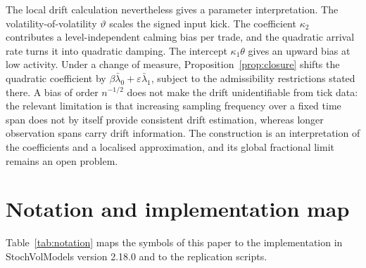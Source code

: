 The local drift calculation nevertheless gives a parameter interpretation. The volatility-of-volatility $\vartheta$ scales the signed input kick. The coefficient $\kappa_2$ contributes a level-independent calming bias per trade, and the quadratic arrival rate turns it into quadratic damping. The intercept $\kappa_1\theta$ gives an upward bias at low activity. Under a change of measure, Proposition~\ref{prop:closure} shifts the quadratic coefficient by $\beta\bar\lambda_0+\varepsilon\bar\lambda_1$, subject to the admissibility restrictions stated there. A bias of order $n^{-1/2}$ does not make the drift unidentifiable from tick data: the relevant limitation is that increasing sampling frequency over a fixed time span does not by itself provide consistent drift estimation, whereas longer observation spans carry drift information. The construction is an interpretation of the coefficients and a localised approximation, and its global fractional limit remains an open problem.


\section{Notation and implementation map}\label{app:notation}

Table~\ref{tab:notation} maps the symbols of this paper to the implementation in StochVolModels version 2.18.0 and to the replication scripts.

